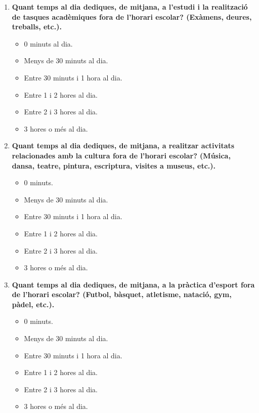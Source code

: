 \documentclass[12pt]{article}
\begin{document}
\begin{enumerate}
    \item \textbf{Quant temps al dia dediques, de mitjana, a l'estudi i la realització de tasques acadèmiques fora de l'horari escolar? (Exàmens, deures, treballs, etc.).}
    \begin{itemize}
        \item[$\square$] 0 minuts al dia.
        \item[$\square$] Menys de 30 minuts al dia.
        \item[$\square$] Entre 30 minuts i 1 hora al dia.
        \item[$\square$] Entre 1 i 2 hores al dia.
        \item[$\square$] Entre 2 i 3 hores al dia.
        \item[$\square$] 3 hores o més al dia.
    \end{itemize}

    \item \textbf{Quant temps al dia dediques, de mitjana, a realitzar activitats relacionades amb la cultura fora de l'horari escolar? (Música, dansa, teatre, pintura, escriptura, visites a museus, etc.).}
    \begin{itemize}
        \item[$\square$] 0 minuts.
        \item[$\square$] Menys de 30 minuts al dia.
        \item[$\square$] Entre 30 minuts i 1 hora al dia.
        \item[$\square$] Entre 1 i 2 hores al dia.
        \item[$\square$] Entre 2 i 3 hores al dia.
        \item[$\square$] 3 hores o més al dia.
    \end{itemize}

    \item \textbf{Quant temps al dia dediques, de mitjana, a la pràctica d'esport fora de l'horari escolar? (Futbol, bàsquet, atletisme, natació, gym, pàdel, etc.).}
    \begin{itemize}
        \item[$\square$] 0 minuts.
        \item[$\square$] Menys de 30 minuts al dia.
        \item[$\square$] Entre 30 minuts i 1 hora al dia.
        \item[$\square$] Entre 1 i 2 hores al dia.
        \item[$\square$] Entre 2 i 3 hores al dia.
        \item[$\square$] 3 hores o més al dia.
    \end{itemize}


\end{enumerate}
\end{document}
